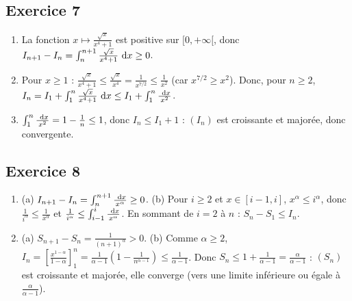 \begin{corrige}
\subsection*{Exercice 7}
\begin{enumerate}
\item La fonction $x\mapsto\frac{\sqrt{x}}{x^4+1}$ est positive sur $[0,+\infty[$, donc $I_{n+1} - I_n = \int_n^{n+1}\frac{\sqrt{x}}{x^4+1}~\mathrm{d}x\geq 0$.
\item Pour $x\geq 1$ : $\frac{\sqrt{x}}{x^4+1}\leq\frac{\sqrt{x}}{x^4} = \frac{1}{x^{7/2}}\leq\frac{1}{x^2}$ (car $x^{7/2}\geq x^2$).
      Donc, pour $n\geq 2$, $I_n = I_1 + \int_1^n\frac{\sqrt{x}}{x^4+1}~\mathrm{d}x\leq I_1 + \int_1^n\frac{~\mathrm{d}x}{x^2}$.
\item $\int_1^n\frac{~\mathrm{d}x}{x^2} = 1 - \frac{1}{n}\leq 1$, donc $I_n\leq I_1 + 1$ : $(I_n)$ est croissante et major\'ee, donc convergente.
\end{enumerate}

\subsection*{Exercice 8}
\begin{enumerate}
\item (a) $I_{n+1} - I_n = \int_n^{n+1}\frac{~\mathrm{d}x}{x^\alpha}\geq 0$.
      (b) Pour $i\geq 2$ et $x\in[i-1,i]$, $x^\alpha\leq i^\alpha$, donc $\frac{1}{i^\alpha}\leq\frac{1}{x^\alpha}$ et
      $\frac{1}{i^\alpha}\leq\int_{i-1}^i\frac{~\mathrm{d}x}{x^\alpha}$. En sommant de $i = 2$ \`a $n$ : $S_n - S_1\leq I_n$.
\item (a) $S_{n+1} - S_n = \frac{1}{(n+1)^\alpha} > 0$.
      (b) Comme $\alpha\geq 2$, $I_n = \left[\frac{x^{1-\alpha}}{1-\alpha}\right]_1^n = \frac{1}{\alpha-1}\left(1 - \frac{1}{n^{\alpha-1}}\right)\leq\frac{1}{\alpha-1}$.
      Donc $S_n\leq 1 + \frac{1}{\alpha-1} = \frac{\alpha}{\alpha-1}$ : $(S_n)$ est croissante et major\'ee, elle converge
      (vers une limite inf\'erieure ou \'egale \`a $\frac{\alpha}{\alpha-1}$).
\end{enumerate}


\end{corrige}
